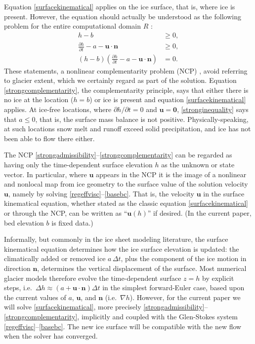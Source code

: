 \documentclass[letterpaper,final,12pt,reqno]{amsart}
\newcommand{\grad}{\nabla}
\newcommand{\bn}{\mathbf{n}}
\newcommand{\bu}{\mathbf{u}}
\newcommand{\bzero}{\bm{0}}
\begin{document}
Equation \eqref{surfacekinematical} applies on the ice surface, that is, where ice is present.  However, the equation should actually be understood as the following problem for the entire computational domain $R$ \cite{SchoofHewitt2013}:
\begin{align}
h-b &\ge 0, \label{strongadmissibility} \\
\frac{\partial h}{\partial t} - a - \bu \cdot \bn &\ge 0, \label{stronginequality} \\
(h-b) \left(\frac{\partial h}{\partial t} - a - \bu \cdot \bn\right) &= 0. \label{strongcomplementarity}
\end{align}
These statements, a nonlinear complementarity problem (NCP) \cite{Bueler2016,Bueler2020,Calvoetal2002}, avoid referring to glacier extent, which we certainly regard as part of the solution.  Equation \eqref{strongcomplementarity}, the complementarity principle, says that either there is no ice at the location ($h=b$) or ice is present and equation \eqref{surfacekinematical} applies.  At ice-free locations, where $\partial h/\partial t=0$ and $\bu=\bzero$, \eqref{stronginequality} says that $a \le 0$, that is, the surface mass balance is not positive.  Physically-speaking, at such locations snow melt and runoff exceed solid precipitation, and ice has not been able to flow there either.

The NCP \eqref{strongadmissibility}--\eqref{strongcomplementarity} can be regarded as having only the time-dependent surface elevation $h$ as the unknown or state vector.  In particular, where $\bu$ appears in the NCP it is the image of a nonlinear and nonlocal map from ice geometry to the surface value of the solution velocity $\bu$, namely by solving \eqref{regeffvisc}--\eqref{basebc}.  That is, the velocity $\bu$ in the surface kinematical equation, whether stated as the classic equation \eqref{surfacekinematical} or through the NCP, can be written as ``$\bu(h)$'' if desired.  (In the current paper, bed elevation $b$ is fixed data.)

Informally, but commonly in the ice sheet modeling literature, the surface kinematical equation determines how the ice surface elevation is updated: the climatically added or removed ice $a\,\Delta t$, plus the component of the ice motion in direction $\bn$, determines the vertical displacement of the surface.  Most numerical glacier models therefore evolve the time-dependent surface $z=h$ by explicit steps, i.e.~$\Delta h \approx \left(a + \bu\cdot \bn\right) \Delta t$ in the simplest forward-Euler case, based upon the current values of $a$, $\bu$, and $\bn$ (i.e.~$\grad h$).  However, for the current paper we will solve \eqref{surfacekinematical}, more precisely \eqref{strongadmissibility}--\eqref{strongcomplementarity}, implicitly and coupled with the Glen-Stokes system \eqref{regeffvisc}--\eqref{basebc}.  The new ice surface will be compatible with the new flow when the solver has converged.
\end{document}
